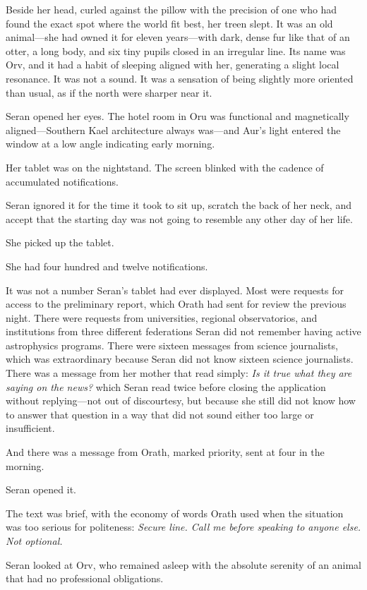 \documentclass[11pt,a5paper,twoside]{book}
\begin{document}
Beside her head, curled against the pillow with the precision of one who had found the exact spot where the world fit best, her treen slept. It was an old animal—she had owned it for eleven years—with dark, dense fur like that of an otter, a long body, and six tiny pupils closed in an irregular line. Its name was Orv, and it had a habit of sleeping aligned with her, generating a slight local resonance. It was not a sound. It was a sensation of being slightly more oriented than usual, as if the north were sharper near it.

Seran opened her eyes. The hotel room in Oru was functional and magnetically aligned—Southern Kael architecture always was—and Aur’s light entered the window at a low angle indicating early morning.

Her tablet was on the nightstand. The screen blinked with the cadence of accumulated notifications.

Seran ignored it for the time it took to sit up, scratch the back of her neck, and accept that the starting day was not going to resemble any other day of her life.

She picked up the tablet.

She had four hundred and twelve notifications.

It was not a number Seran's tablet had ever displayed. Most were requests for access to the preliminary report, which Orath had sent for review the previous night. There were requests from universities, regional observatorios, and institutions from three different federations Seran did not remember having active astrophysics programs. There were sixteen messages from science journalists, which was extraordinary because Seran did not know sixteen science journalists. There was a message from her mother that read simply: \textit{Is it true what they are saying on the news?} which Seran read twice before closing the application without replying—not out of discourtesy, but because she still did not know how to answer that question in a way that did not sound either too large or insufficient.

And there was a message from Orath, marked priority, sent at four in the morning.

Seran opened it.

The text was brief, with the economy of words Orath used when the situation was too serious for politeness: \textit{Secure line. Call me before speaking to anyone else. Not optional.}

Seran looked at Orv, who remained asleep with the absolute serenity of an animal that had no professional obligations.
\end{document}
